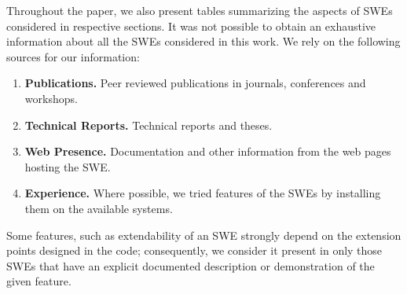 Throughout the paper, we also present tables
summarizing the aspects of SWEs considered in respective sections. It was not
possible to obtain an exhaustive information about all the SWEs considered in
this work. We rely on the following sources for our information: 
\begin{enumerate}
    \item \textbf{Publications.} Peer reviewed publications in journals, conferences and workshops.
    \item \textbf{Technical Reports.} Technical reports and theses.
    \item \textbf{Web Presence.} Documentation and other information from the web pages hosting the SWE.
    \item \textbf{Experience.} Where possible, we tried features of the SWEs by installing them on the available systems. 
\end{enumerate}

Some features, such as extendability of an SWE strongly depend on the extension
points designed in the code; consequently, we consider it present in only those
SWEs that have an explicit documented description or demonstration of the given
feature. 
